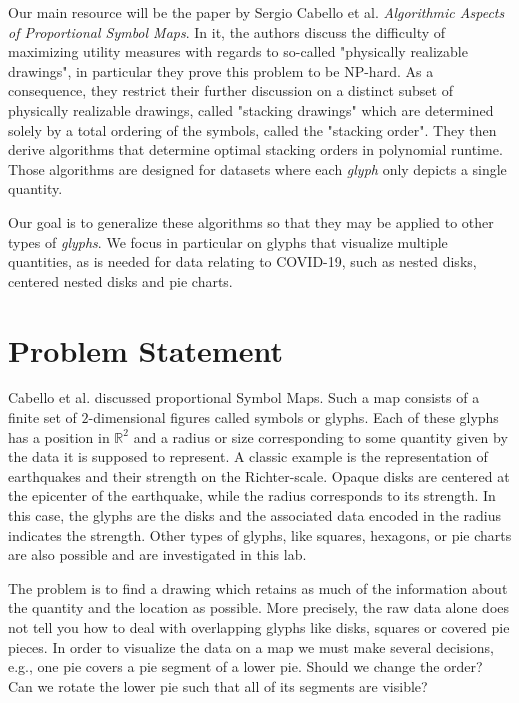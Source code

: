 \documentclass[a4paper,11pt]{article}
\begin{document}
Our main resource will be the paper by Sergio Cabello et al. \textit{Algorithmic Aspects of Proportional Symbol Maps}. In it, the authors discuss the difficulty of maximizing utility measures with regards to so-called "physically realizable drawings", in particular they prove this problem to be NP-hard. As a consequence, they restrict their further discussion on a distinct subset of physically realizable drawings, called "stacking drawings" which are determined solely by a total ordering of the symbols, called the "stacking order". They then derive algorithms that determine optimal stacking orders in polynomial runtime. Those algorithms are designed for datasets where each \textit{glyph} only depicts a single quantity.

Our goal is to generalize these algorithms so that they may be applied to other types of \textit{glyphs}. We focus in particular on glyphs that visualize multiple quantities, as is needed for data relating to COVID-19, such as nested disks, centered nested disks and pie charts.

\newpage

\section{Problem Statement}

Cabello et al. discussed proportional Symbol Maps. Such a map consists of a finite set of $2$-dimensional figures called symbols or glyphs. Each of these glyphs has a position in $\mathbb{R}^2$ and a radius or size corresponding to some quantity given by the data it is supposed to represent. A classic example is the representation of earthquakes and their strength on the Richter-scale. Opaque disks are centered at the epicenter of the earthquake, while the radius corresponds to its strength. In this case, the glyphs are the disks and the associated data encoded in the radius indicates the strength. Other types of glyphs, like squares, hexagons, or pie charts are also possible and are investigated in this lab.

The problem is to find a drawing which retains as much of the information about the quantity and the location as possible. More precisely, the raw data alone does not tell you how to deal with overlapping glyphs like disks, squares or covered pie pieces. In order to visualize the data on a map we must make several decisions, e.g., one pie covers a pie segment of a lower pie. Should we change the order? Can we rotate the lower pie such that all of its segments are visible?
\end{document}
